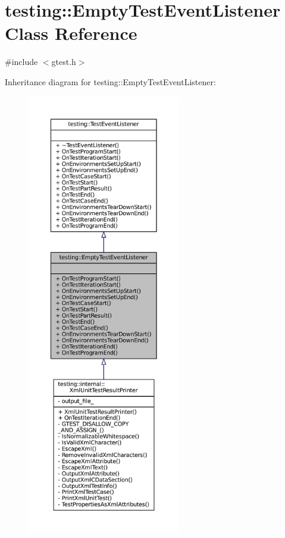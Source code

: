 \hypertarget{classtesting_1_1EmptyTestEventListener}{}\section{testing\+:\+:Empty\+Test\+Event\+Listener Class Reference}
\label{classtesting_1_1EmptyTestEventListener}


{\ttfamily \#include $<$gtest.\+h$>$}



Inheritance diagram for testing\+:\+:Empty\+Test\+Event\+Listener\+:
\nopagebreak
\begin{figure}[H]
\begin{center}
\leavevmode
\includegraphics[height=550pt]{classtesting_1_1EmptyTestEventListener__inherit__graph}
\end{center}
\end{figure}


